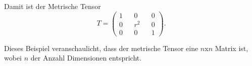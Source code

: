 Damit ist der Metrische Tensor 
\begin{equation}
	T = \begin{pmatrix} 1 && 0 && 0 \\ 0 && r^2 && 0 \\ 0 && 0 && 1 \end{pmatrix} .
\end{equation}

Dieses Beispiel veranschaulicht, dass der metrische Tensor eine $n$x$n$ Matrix ist, wobei $n$ der Anzahl Dimensionen entspricht.

